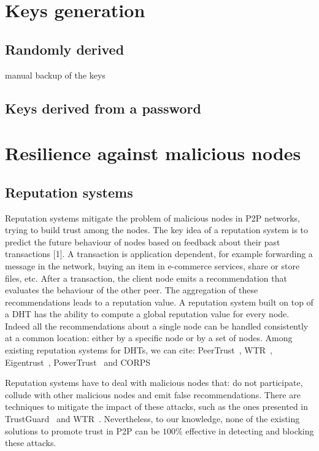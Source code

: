 \section{Keys generation}
\subsection{Randomly derived}
  manual backup of the keys
\subsection{Keys derived from a password}

\section{Resilience against malicious nodes}

 \subsection{Reputation systems}
Reputation systems mitigate the problem of malicious nodes in
P2P networks, trying to build trust among the nodes. The key
idea of a reputation system is to predict the future behaviour
of nodes based on feedback about their past transactions [1]. A
transaction is application dependent, for example forwarding a
message in the network, buying an item in e-commerce services,
share or store files, etc. After a transaction, the client node emits
a recommendation that evaluates the behaviour of the other peer.
The aggregation of these recommendations leads to a reputation
value.
A reputation system built on top of a DHT has the ability
to compute a global reputation value for every node. Indeed
all the recommendations about a single node can be handled
consistently at a common location: either by a specific node
or by a set of nodes. Among existing reputation systems for
DHTs, we can cite: PeerTrust~\cite{peertrust}, WTR~\cite{wtr},
Eigentrust~\cite{eigentrust},
PowerTrust~\cite{powertrust} and CORPS~\cite{corps}

Reputation systems have to deal with malicious nodes that:
do not participate, collude with other malicious nodes and
emit false recommendations. There are techniques to mitigate
the impact of these attacks, such as the ones presented in
TrustGuard~\cite{trustguard} and WTR~\cite{wtr}. Nevertheless, to our knowledge,
none of the existing solutions to promote trust in P2P can be
$100\%$ effective in detecting and blocking these attacks.

